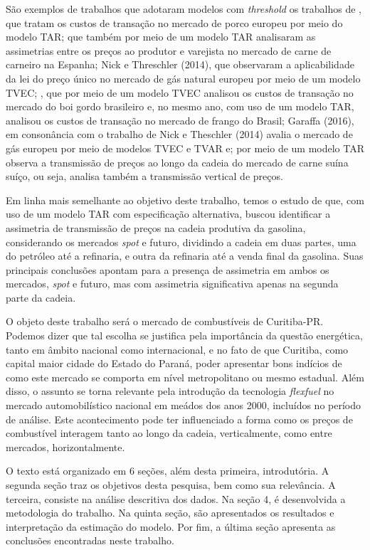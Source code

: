 \documentclass[
	article,			%
	12pt,				%
	openright,			%
	oneside,			%
	a4paper,			%
	english,			%
	brazil				%
	]{abntex2}
\begin{document}
São exemplos de trabalhos que adotaram modelos com \textit{threshold} os trabalhos de , que tratam os custos de transação no mercado de porco europeu por meio do modelo TAR;  que também por meio de um modelo TAR analisaram as assimetrias entre os preços ao produtor e varejista no mercado de carne de carneiro na Espanha; Nick e Threschler (2014), que observaram a aplicabilidade da lei do preço único no mercado de gás natural europeu por meio de um modelo TVEC; , que por meio de um modelo TVEC analisou os custos de transação no mercado do boi gordo brasileiro e, no mesmo ano, com uso de um modelo TAR, analisou os custos de transação no mercado de frango do Brasil; Garaffa (2016), em consonância com o trabalho de Nick e Theschler (2014) avalia o mercado de gás europeu por meio de modelos TVEC e TVAR e;  por meio de um modelo TAR observa a transmissão de preços ao longo da cadeia do mercado de carne suína suíço, ou seja, analisa também a transmissão vertical de preços.

Em linha mais semelhante ao objetivo deste trabalho, temos o estudo de  que, com uso de um modelo TAR com especificação alternativa, buscou identificar a assimetria de transmissão de preços na cadeia produtiva da gasolina, considerando os mercados \textit{spot} e futuro, dividindo a cadeia em duas partes, uma do petróleo até a refinaria, e outra da refinaria até a venda final da gasolina. Suas principais conclusões apontam para a presença de assimetria em ambos os mercados, \textit{spot} e futuro, mas com  assimetria significativa apenas na segunda parte da cadeia.

O objeto deste trabalho será o mercado de combustíveis de Curitiba-PR. Podemos dizer que tal escolha se justifica pela importância da questão energética, tanto em âmbito nacional como internacional, e no fato de que Curitiba, como capital  maior cidade do Estado do Paraná, poder apresentar bons indícios de como este mercado se comporta em nível metropolitano ou mesmo estadual.  Além disso, o assunto se torna relevante pela introdução da tecnologia \textit{flexfuel} no mercado automobilístico nacional em meádos dos anos 2000, incluídos no período de análise. Este acontecimento pode ter influenciado a forma como os preços de combustível interagem tanto ao longo da cadeia, verticalmente, como entre mercados, horizontalmente.

O texto está organizado em 6 seções, além desta primeira, introdutória. A segunda seção traz os objetivos desta pesquisa, bem como sua relevância. A terceira, consiste na análise descritiva dos dados. Na seção 4, é desenvolvida a metodologia do trabalho. Na quinta seção, são apresentados os resultados e interpretação da estimação do modelo. Por fim, a última seção apresenta as conclusões encontradas neste trabalho.
\end{document}
